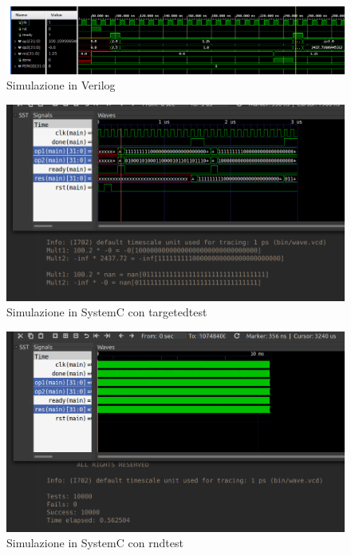 \documentclass[]{IEEEtran}
\begin{document}
\begin{figure}[bt]
\centering
\includegraphics[width=\textwidth]{figures/simulazione1}
\caption{Simulazione in Verilog}
\label{fig:SIM1}
\end{figure}

\begin{figure}[bt]
\centering
\includegraphics[width=\textwidth]{figures/simulazione2}
\caption{Simulazione in SystemC con targeted\textunderscore test}
\label{fig:SIM2}
\end{figure}

\begin{figure}[bt]
\centering
\includegraphics[width=\textwidth]{figures/simulazione3}
\caption{Simulazione in SystemC con rnd\textunderscore test}
\label{fig:SIM3}
\end{figure}
\end{document}
